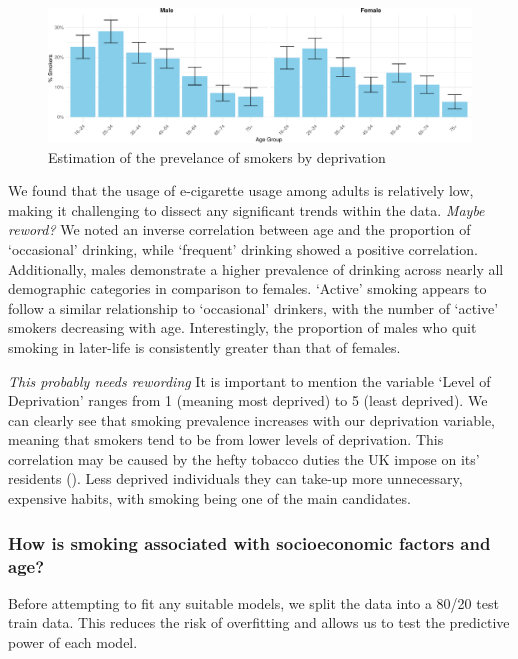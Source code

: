 \documentclass[
  11pt,
]{article}
\begin{document}
\begin{figure}[H]
\includegraphics{Coursework_files/figure-latex/output prevelance plot-1} \caption{Estimation of the prevelance of smokers by deprivation}\label{fig:output prevelance plot}
\end{figure}

We found that the usage of e-cigarette usage among adults is relatively
low, making it challenging to dissect any significant trends within the
data. \emph{Maybe reword?} We noted an inverse correlation between age
and the proportion of `occasional' drinking, while `frequent' drinking
showed a positive correlation. Additionally, males demonstrate a higher
prevalence of drinking across nearly all demographic categories in
comparison to females. `Active' smoking appears to follow a similar
relationship to `occasional' drinkers, with the number of `active'
smokers decreasing with age. Interestingly, the proportion of males who
quit smoking in later-life is consistently greater than that of females.

\emph{This probably needs rewording} It is important to mention the
variable `Level of Deprivation' ranges from 1 (meaning most deprived) to
5 (least deprived). We can clearly see that smoking prevalence increases
with our deprivation variable, meaning that smokers tend to be from
lower levels of deprivation. This correlation may be caused by the hefty
tobacco duties the UK impose on its' residents
(). Less deprived individuals they can
take-up more unnecessary, expensive habits, with smoking being one of
the main candidates.

\subsubsection{How is smoking associated with socioeconomic factors and
age?}\label{how-is-smoking-associated-with-socioeconomic-factors-and-age}

Before attempting to fit any suitable models, we split the data into a
80/20 test train data. This reduces the risk of overfitting and allows
us to test the predictive power of each model.
\end{document}
